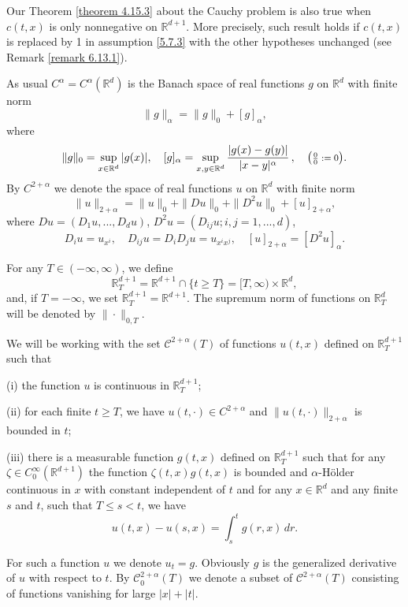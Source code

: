 \documentclass[reqno,12pt]{amsart}
\theoremstyle{definition}
\theoremstyle{remark}
\begin{document}
  Our Theorem \ref{theorem 4.15.3} about the Cauchy problem
 is  also true when $c(t,x)$ is
only nonnegative  on ${\mathbb{R}}^{d+1}$. More precisely, such result
holds if $c(t,x)$ is replaced by  1 in  assumption \eqref{5.7.3}
with the other hypotheses  unchanged (see Remark \ref{remark 6.13.1}).  
 

As usual $C^{\alpha}=C^{\alpha}({\mathbb{R}}^{d})$ is the Banach space of
real functions $g$ on ${\mathbb{R}}^{d}$ with finite norm
$$
\|g\|_{\alpha}=\|g\|_{0}+[g]_{\alpha},
$$
where
$$
\|g\|_0=\sup_{x \in {\mathbb{R}}^{d}}|g(x)|,\quad
[g]_{\alpha}=\sup_{x,y\in{\mathbb{R}}^{d}}
\frac{|g(x)-g(y)|}{|x-y|^{\alpha}}\,,\quad\big(\mbox{\footnotesize{$
\frac{0}{0}:=0$}}\big).
$$
By $C^{2+\alpha}$ we denote the space of real functions $u$ on
${\mathbb{R}}^{d}$ with finite norm
$$
\|u\|_{2+\alpha}=\|u\|_{0}+\|Du\|_{0} +\|D^{2}u\|_{0} + [
u]_{2+\alpha},
$$
where $Du=(D_{1}u,...,D_{d}u)$, $D^{2}u=(D_{ij}u;i,j=1,...,d)$,
$$
D_{i}u=u_{x^{i}},\quad D_{ij}u=D_{i}D_{j}u=u_{x^{i}x^{j}},\quad
   [u]_{2+ \alpha} = [D^{2}u]_{\alpha} .
$$

   For any $T\in(-\infty,\infty)$,  we  define
$$
{\mathbb{R}}^{d+1}_{T}= {\mathbb{R}}^{d+1}\cap\{t\geq T\}= [T,  \infty) \times
{\mathbb{R}}^d,
$$
and, if $T=-\infty$, we set ${\mathbb{R}}^{d+1}_{T}={\mathbb{R}}^{d+1}$.
The supremum norm of functions on
${\mathbb{R}}^{d}_{T}$ will be denoted by $\|\cdot\|_{0,T}$.
    

We will be working with the set ${\mathcal{C}}^{2+\alpha}(T)$ of functions
$u(t,x)$ defined on ${\mathbb{R}}^{d+1}_{T}$ such that

(i) the function $u$ is continuous in ${\mathbb{R}}^{d+1}_{T}$;

(ii) for each  finite $t\geq T$, we have $u(t,\cdot)\in
C^{2+\alpha} $ and $\|u(t,\cdot)\|_{2+\alpha}$ is bounded
in $t$;

(iii) there is a  measurable  function $g(t,x)$ defined on
${\mathbb{R}}^{d+1}_{T}$ such that for any $\zeta\in
C^{\infty}_{0}({\mathbb{R}}^{d+1})$ the function $\zeta(t,x) g(t,x)$ is
bounded  and $\alpha$-H\"older continuous in $x$ with constant
independent of $t$   and for any $x\in{\mathbb{R}}^{d}$   and any finite
$s$ and $t$, such that  $T\leq s<t $, we have
\begin{equation} \label{g1}
u(t,x)-u(s,x)=\int_{s}^{t}g(r,x)\,dr.
\end{equation}

For such a function $u$ we denote $u_{t}=g$. Obviously $g$ is the
generalized derivative of $u$ with respect to $t$. By
${\mathcal{C}}^{2+\alpha}_{0}(T)$ we denote a subset of ${\mathcal{C}}^{2+\alpha}(T)$
consisting of functions vanishing for large  $|x|+|t|$.
\end{document}
